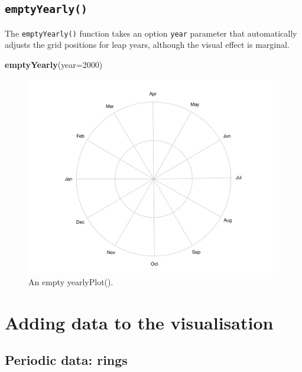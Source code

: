 \documentclass[
]{book}
\newenvironment{Shaded}{\begin{snugshade}}{\end{snugshade}}
\newcommand{\AttributeTok}[1]{\textcolor[rgb]{0.13,0.29,0.53}{#1}}
\newcommand{\DecValTok}[1]{\textcolor[rgb]{0.00,0.00,0.81}{#1}}
\newcommand{\FunctionTok}[1]{\textcolor[rgb]{0.13,0.29,0.53}{\textbf{#1}}}
\newcommand{\NormalTok}[1]{#1}
\begin{document}
\hypertarget{emptyyearly}{%
\subsection{\texorpdfstring{\texttt{emptyYearly()}}{emptyYearly()}}\label{emptyyearly}}

The \texttt{emptyYearly()} function takes an option \texttt{year} parameter that automatically adjusts the grid positions for leap years, although the visual effect is marginal.

\begin{Shaded}
\begin{Highlighting}[]
\FunctionTok{emptyYearly}\NormalTok{(}\AttributeTok{year=}\DecValTok{2000}\NormalTok{)}
\end{Highlighting}
\end{Shaded}

\begin{figure}

{\centering \includegraphics[width=0.9\linewidth]{_main_files/figure-latex/emptyYearly-1} 

}

\caption{An empty yearlyPlot().}\label{fig:emptyYearly}
\end{figure}

\hypertarget{adding-to-cyclical}{%
\section{Adding data to the visualisation}\label{adding-to-cyclical}}

\hypertarget{periodic-data-rings}{%
\subsection{Periodic data: rings}\label{periodic-data-rings}}
\end{document}
